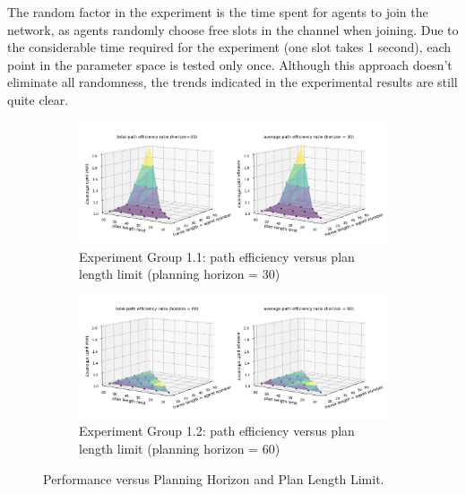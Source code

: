 The random factor in the experiment is the time spent for agents to join the network, as agents randomly choose free slots in the channel when joining.
Due to the considerable time required for the experiment (one slot takes 1 second), each point in the parameter space is tested only once.
Although this approach doesn't eliminate all randomness, the trends indicated in the experimental results are still quite clear.



\begin{figure}[htbp]
    \centering
    \begin{subfigure}[t]{1.1\linewidth}
      \centering
      \includegraphics[width = \linewidth]{figures/horizon30_plan_length_limit_vs_performance.png}
      \caption{Experiment Group 1.1: path efficiency versus plan length limit (planning horizon = 30)}
      \label{fig:horizon=30,performance/planlengthlimit}
    \end{subfigure}
    \begin{subfigure}[t]{1.1\linewidth}
        \centering
        \includegraphics[width = \linewidth]{figures/horizon60_plan_length_limit_vs_performance.png}
        \caption{Experiment Group 1.2: path efficiency versus plan length limit (planning horizon = 60)}
        \label{fig:horizon=60,performance/planlengthlimit}
      \end{subfigure}
    \caption{Performance versus Planning Horizon and Plan Length Limit.}
    \label{fig:plan_length_limit}
\end{figure}

